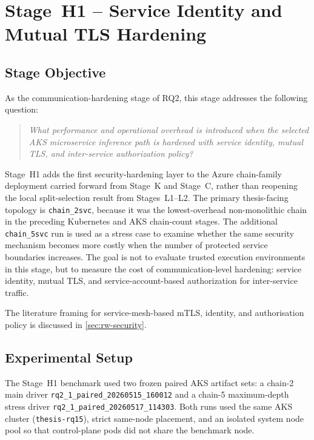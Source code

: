 \section{Stage~H1 -- Service Identity and Mutual TLS Hardening}
\label{sec:rq21}

\subsection{Stage Objective}

As the communication-hardening stage of RQ2, this stage addresses the following question:

\begin{quote}
\textit{What performance and operational overhead is introduced when the selected
AKS microservice inference path is hardened with service identity, mutual TLS, and
inter-service authorization policy?}
\end{quote}

Stage~H1 adds the first security-hardening layer to the Azure chain-family deployment
carried forward from Stage~K and Stage~C, rather than reopening the local split-selection
result from Stages~L1--L2. The primary thesis-facing topology is
\texttt{chain\_2svc}, because it was the lowest-overhead non-monolithic chain in the
preceding Kubernetes and AKS chain-count stages.
The additional \texttt{chain\_5svc} run is used as a stress case to examine whether
the same security mechanism becomes more costly when the number of protected service
boundaries increases. The goal is not to evaluate trusted execution environments in
this stage, but to measure the cost of communication-level hardening: service identity,
mutual TLS, and service-account-based authorization for inter-service traffic.

The literature framing for service-mesh-based mTLS, identity, and
authorisation policy is discussed in \cref{sec:rw-security}.

\subsection{Experimental Setup}

The Stage~H1 benchmark used two frozen paired AKS artifact sets: a chain-2 main
driver \texttt{rq2\_1\_paired\_20260515\_160012} and a chain-5 maximum-depth
stress driver \texttt{rq2\_1\_paired\_20260517\_114303}. Both runs used the
same AKS cluster (\texttt{thesis-rq15}), strict same-node placement, and an
isolated system node pool so that control-plane pods did not share the
benchmark node.

